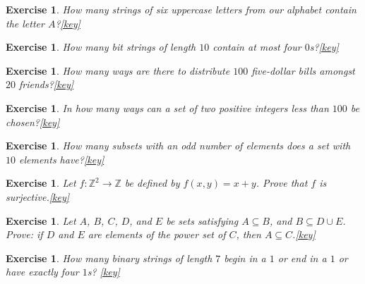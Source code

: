 \documentclass{book}
\newcounter{ekcounter}%
\theoremstyle{ekimcustom}
\newtheorem{exercise}[ekcounter]{Exercise}
\begin{document}
\begin{exercise}
How many strings of six uppercase letters from our alphabet contain the letter $A$?\quad\quad\href{https://www.sharelatex.com/read/dnrbcjbznqwk}{{\color{red}[key]}}
\end{exercise}

\begin{exercise}
How many bit strings of length $10$ contain at most four $0$s?\quad\quad\href{https://www.sharelatex.com/read/xjkhmhchjdjq}{{\color{red}[key]}}
\end{exercise}

\begin{exercise}
How many ways are there to distribute $100$ five-dollar bills amongst $20$ friends?\quad\quad\href{https://www.sharelatex.com/read/nftrhghmkvrd}{{\color{red}[key]}}
\end{exercise}

\begin{exercise}
In how many ways can a set of two positive integers less than $100$ be chosen?\quad\quad\href{https://www.sharelatex.com/read/yprcjryjmnzs}{{\color{red}[key]}}
\end{exercise}

\begin{exercise}
How many subsets with an odd number of elements does a set with $10$ elements have?\quad\quad\href{https://www.sharelatex.com/read/qsqyfbwnhjpp}{{\color{red}[key]}}
\end{exercise}

\begin{exercise}
Let $f : \mathbb{Z}^2 \to \mathbb{Z}$ be defined by $f(x,y)=x+y$. Prove that $f$ is surjective.\quad\quad\href{https://www.sharelatex.com/read/ykgsvznvxyyj}{{\color{red}[key]}}
\end{exercise}

\begin{exercise}
Let $A$, $B$, $C$, $D$, and $E$ be sets satisfying $A \subseteq B$, and $B \subseteq D \cup E$. Prove: if $D$ and $E$ are elements of the power set of $C$, then $A \subseteq C$.\quad\quad\href{https://www.sharelatex.com/read/qhtdvkyfmzmf}{{\color{red}[key]}}
\end{exercise}

\begin{exercise}
How many binary strings of length $7$ begin in a $1$ or end in a $1$ or have exactly four $1$s? \quad\quad\href{https://www.sharelatex.com/read/mfnyssfvgcdn}{{\color{red}[key]}}
\end{exercise}
\end{document}
